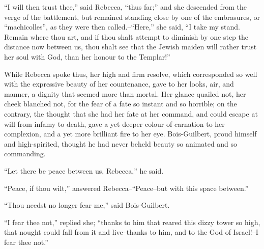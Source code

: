 ``I will then trust thee,'' said Rebecca, ``thus far;'' and she
descended from the verge of the battlement, but remained standing close
by one of the embrasures, or ``machicolles'', as they were then
called.--``Here,'' she said, ``I take my stand. Remain where thou art,
and if thou shalt attempt to diminish by one step the distance now
between us, thou shalt see that the Jewish maiden will rather trust her
soul with God, than her honour to the Templar!''

While Rebecca spoke thus, her high and firm resolve, which corresponded
so well with the expressive beauty of her countenance, gave to her
looks, air, and manner, a dignity that seemed more than mortal. Her
glance quailed not, her cheek blanched not, for the fear of a fate so
instant and so horrible; on the contrary, the thought that she had her
fate at her command, and could escape at will from infamy to death, gave
a yet deeper colour of carnation to her complexion, and a yet more
brilliant fire to her eye. Bois-Guilbert, proud himself and
high-spirited, thought he had never beheld beauty so animated and so
commanding.

``Let there be peace between us, Rebecca,'' he said.

``Peace, if thou wilt,'' answered Rebecca--``Peace--but with this space
between.''

``Thou needst no longer fear me,'' said Bois-Guilbert.

``I fear thee not,'' replied she; ``thanks to him that reared this dizzy
tower so high, that nought could fall from it and live--thanks to him,
and to the God of Israel!--I fear thee not.''

